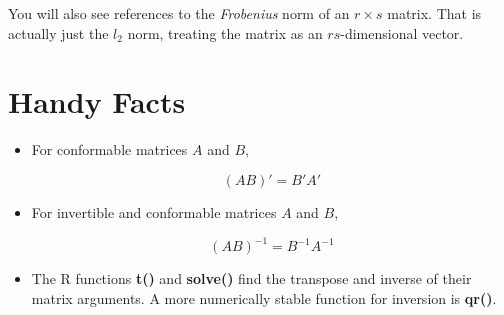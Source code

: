 You will also see references to the {\it Frobenius} norm of an $r \times
s$ matrix.  That is actually just the $l_2$ norm, treating the matrix
as an $rs$-dimensional vector.

\section{Handy Facts}

\begin{itemize}

\item For conformable matrices $A$ and $B$, 

\begin{equation}
(AB)' = B'A'
\end{equation}

\item For invertible and conformable matrices $A$ and $B$, 

\begin{equation}
(AB)^{-1} = B^{-1} A^{-1}
\end{equation}

\item The R functions \textbf{t()} and \textbf{solve()} find the
transpose and inverse of their matrix arguments.  A more numerically
stable function for inversion is \textbf{qr()}.
\end{itemize} 
